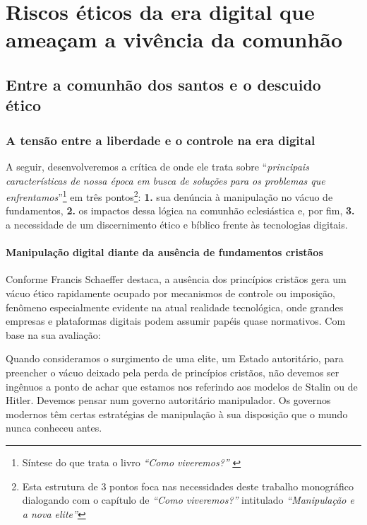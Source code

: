\chapter{Riscos éticos da era digital que ameaçam a vivência da comunhão}

\section{Entre a comunhão dos santos e o descuido ético}

\subsection{A tensão entre a liberdade e o controle na era digital}

A seguir, desenvolveremos a crítica de  onde ele trata sobre ``\textit{principais características de nossa época em busca de soluções para os problemas que enfrentamos}''\footnote{Síntese do que trata o livro \textit{``Como viveremos?''} \cite{schaeffer2002}} em três pontos\footnote{Esta estrutura de 3 pontos foca nas necessidades deste trabalho monográfico dialogando com o capítulo de \textit{``Como viveremos?''} intitulado \textit{``Manipulação e a nova elite''}}: \textbf{1.} sua denúncia à manipulação no vácuo de fundamentos, \textbf{2.} os impactos dessa lógica na comunhão eclesiástica e, por fim, \textbf{3.} a necessidade de um discernimento ético e bíblico frente às tecnologias digitais.

\subsubsection{Manipulação digital diante da ausência de fundamentos cristãos}

Conforme Francis Schaeffer destaca, a ausência dos princípios cristãos gera um vácuo ético rapidamente ocupado por mecanismos de controle ou imposição, fenômeno especialmente evidente na atual realidade tecnológica, onde grandes empresas e plataformas digitais podem assumir papéis quase normativos. Com base na sua avaliação:

\begin{citacao}
    Quando consideramos o surgimento de uma elite, um Estado autoritário, para preencher o vácuo deixado pela perda de princípios cristãos, não devemos ser ingênuos a ponto de achar que estamos nos referindo aos modelos de Stalin ou de Hitler. Devemos pensar num governo autoritário manipulador. Os governos modernos têm certas estratégias de manipulação à sua disposição que o mundo nunca conheceu antes. \cite[p.~168]{schaeffer2002}
\end{citacao}

